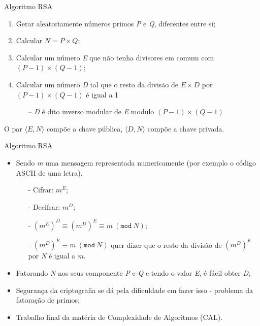 \documentclass[xcolor=table]{beamer}
\begin{document}
    \begin{frame}{Algoritmo RSA}
        \begin{enumerate}
            \item Gerar aleatoriamente números primos \textit{P} e \textit{Q}, diferentes entre si;
            \item Calcular \(N = P \times Q\);
            \item Calcular um número \textit{E} que não tenha divisores em comum com \((P-1) \times (Q-1)\);
            \item Calcular um número \textit{D} tal que o resto da divisão de \(E \times D\) por \((P-1) \times (Q-1)\) é igual a 1
            \begin{itemize}
                \item[--] \textit{D} é dito inverso modular de \textit{E} modulo \((P-1) \times (Q-1)\)
            \end{itemize}        
        \end{enumerate}
        O par \(\langle E, N \rangle\) compõe a chave pública, \(\langle D, N \rangle\) compõe a chave privada.
    \end{frame}

    \begin{frame}{Algoritmo RSA}
        \begin{itemize}
            \item Sendo \textit{m} uma mensagem representada numericamente (por exemplo o código ASCII de uma letra).
            \begin{itemize}
                \item[-] Cifrar: \(m^{E}\);
                \item[-] Decifrar: \(m^{D}\);
                \item[-] \((m^{E})^{D} \equiv (m^{D})^{E} \equiv m\ (\mathtt{mod}\ N)\);
                \item[-] \((m^{D})^{E} \equiv m\ (\mathtt{mod}\ N)\) quer dizer que o resto da divisão de
                        \((m^{D})^{E}\) por \textit{N} é igual a \textit{m}.
            \end{itemize}
            \item Fatorando \textit{N} nos seus componente \textit{P} e \textit{Q} e tendo o valor \textit{E}, é fácil obter \textit{D};
            \item Segurança da criptografia se dá pela dificuldade em fazer isso - problema da fatoração de primos;
            \item Trabalho final da matéria de Complexidade de Algoritmos (CAL).
        \end{itemize}
    \end{frame}
\end{document}
